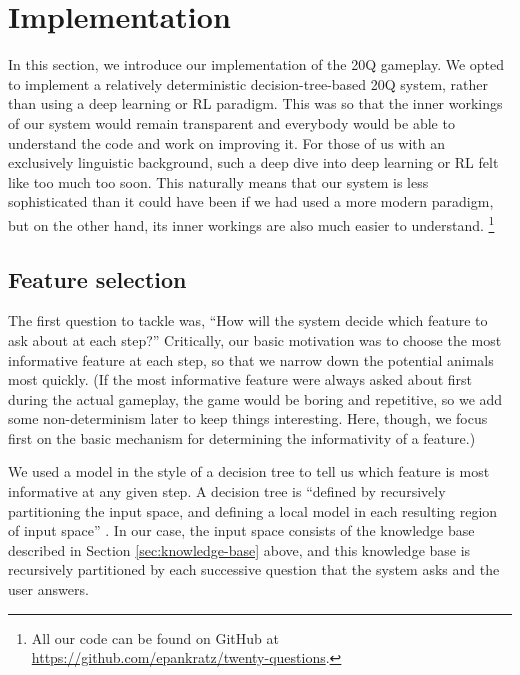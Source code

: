 \documentclass[11pt,a4paper]{article}
\begin{document}
\section{Implementation}
\label{sec:impl}

In this section, we introduce our implementation of the 20Q gameplay.
We opted to implement a relatively deterministic decision-tree-based 20Q system, rather than using a deep learning or RL paradigm.
This was so that the inner workings of our system would remain transparent and everybody would be able to understand the code and work on improving it.
For those of us with an exclusively linguistic background, such a deep dive into deep learning or RL felt like too much too soon.
This naturally means that our system is less sophisticated than it could have been if we had used a more modern paradigm, but on the other hand, its inner workings are also much easier to understand.%
    \footnote{All our code can be found on GitHub at \url{https://github.com/epankratz/twenty-questions}.}

\subsection{Feature selection}
\label{subsec:featselec}

The first question to tackle was, ``How will the system decide which feature to ask about at each step?''
Critically, our basic motivation was to choose the most informative feature at each step, so that we narrow down the potential animals most quickly.
(If the most informative feature were always asked about first during the actual gameplay, the game would be boring and repetitive, so we add some non-determinism later to keep things interesting.
Here, though, we focus first on the basic mechanism for determining the informativity of a feature.)

We used a model in the style of a decision tree to tell us which feature is most informative at any given step.
A decision tree is ``defined by recursively partitioning the input space, and defining a local model in each resulting region of input space'' \citep[545]{Murphy2012}.
In our case, the input space consists of the knowledge base described in Section \ref{sec:knowledge-base} above, and this knowledge base is recursively partitioned by each successive question that the system asks and the user answers.
\end{document}
